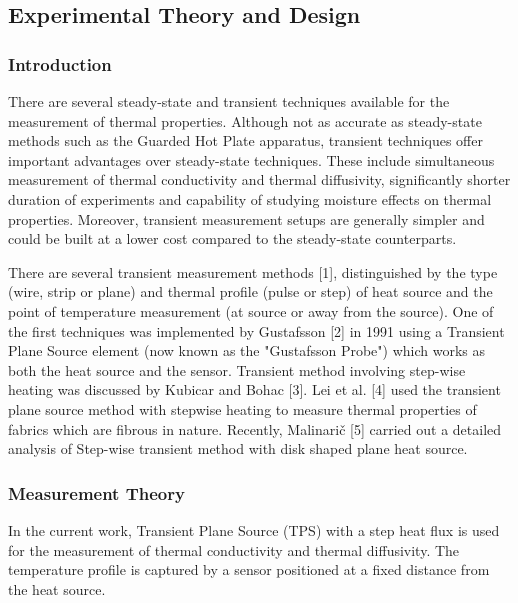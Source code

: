 \documentclass[]{article}
\date{}
\begin{document}
\hypertarget{header-n0}{%
\subsection{Experimental Theory and Design}\label{header-n0}}

\hypertarget{header-n2}{%
\subsubsection{Introduction}\label{header-n2}}

There are several steady-state and transient techniques available for
the measurement of thermal properties. Although not as accurate as
steady-state methods such as the Guarded Hot Plate apparatus, transient
techniques offer important advantages over steady-state techniques.
These include simultaneous measurement of thermal conductivity and
thermal diffusivity, significantly shorter duration of experiments and
capability of studying moisture effects on thermal properties. Moreover,
transient measurement setups are generally simpler and could be built at
a lower cost compared to the steady-state counterparts.

There are several transient measurement methods {[}1{]}, distinguished
by the type (wire, strip or plane) and thermal profile (pulse or step)
of heat source and the point of temperature measurement (at source or
away from the source). One of the first techniques was implemented by
Gustafsson {[}2{]} in 1991 using a Transient Plane Source element (now
known as the "Gustafsson Probe") which works as both the heat source and
the sensor. Transient method involving step-wise heating was discussed
by Kubicar and Bohac {[}3{]}. Lei et al. {[}4{]} used the transient
plane source method with stepwise heating to measure thermal properties
of fabrics which are fibrous in nature. Recently, Malinarič {[}5{]}
carried out a detailed analysis of Step-wise transient method with disk
shaped plane heat source.

\hypertarget{header-n7}{%
\subsubsection{Measurement Theory}\label{header-n7}}

In the current work, Transient Plane Source (TPS) with a step heat flux
is used for the measurement of thermal conductivity and thermal
diffusivity. The temperature profile is captured by a sensor positioned
at a fixed distance from the heat source.
\end{document}
